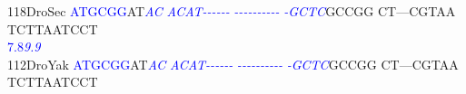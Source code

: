 \documentclass[11pt,twoside,reqno,a4paper]{article}
\begin{document}
{118\hspace*{1\charwidth}DroSec	\textcolor{Blue}{A}\textcolor{Blue}{T}\textcolor{Blue}{G}\textcolor{Blue}{C}\textcolor{Blue}{G}\textcolor{Blue}{G}AT\textit{\textcolor{Blue}{A}}\textit{\textcolor{Blue}{C}}	\textit{\textcolor{Blue}{A}}\textit{\textcolor{Blue}{C}}\textit{\textcolor{Blue}{A}}\textit{\textcolor{Blue}{T}}\textit{\textcolor{Blue}{-}}\textit{\textcolor{Blue}{-}}\textit{\textcolor{Blue}{-}}\textit{\textcolor{Blue}{-}}\textit{\textcolor{Blue}{-}}\textit{\textcolor{Blue}{-}}	\textit{\textcolor{Blue}{-}}\textit{\textcolor{Blue}{-}}\textit{\textcolor{Blue}{-}}\textit{\textcolor{Blue}{-}}\textit{\textcolor{Blue}{-}}\textit{\textcolor{Blue}{-}}\textit{\textcolor{Blue}{-}}\textit{\textcolor{Blue}{-}}\textit{\textcolor{Blue}{-}}\textit{\textcolor{Blue}{-}}	\textit{\textcolor{Blue}{-}}\textit{\textcolor{Blue}{G}}\textit{\textcolor{Blue}{C}}\textit{\textcolor{Blue}{T}}\textit{\textcolor{Blue}{C}}GCCGG	CT---CGTAA	TCTTAATCCT	\\
\hspace*{4\charwidth}\hspace*{7\charwidth}\hspace*{0\charwidth}\textcolor{Blue}{7.8}\hspace*{5\charwidth}\textit{\textcolor{Blue}{9.9}}\hspace*{1\charwidth}\hspace*{1\charwidth}\hspace*{1\charwidth}\hspace*{1\charwidth}\hspace*{1\charwidth}\hspace*{1\charwidth}\\
112\hspace*{1\charwidth}DroYak	\textcolor{Blue}{A}\textcolor{Blue}{T}\textcolor{Blue}{G}\textcolor{Blue}{C}\textcolor{Blue}{G}\textcolor{Blue}{G}AT\textit{\textcolor{Blue}{A}}\textit{\textcolor{Blue}{C}}	\textit{\textcolor{Blue}{A}}\textit{\textcolor{Blue}{C}}\textit{\textcolor{Blue}{A}}\textit{\textcolor{Blue}{T}}\textit{\textcolor{Blue}{-}}\textit{\textcolor{Blue}{-}}\textit{\textcolor{Blue}{-}}\textit{\textcolor{Blue}{-}}\textit{\textcolor{Blue}{-}}\textit{\textcolor{Blue}{-}}	\textit{\textcolor{Blue}{-}}\textit{\textcolor{Blue}{-}}\textit{\textcolor{Blue}{-}}\textit{\textcolor{Blue}{-}}\textit{\textcolor{Blue}{-}}\textit{\textcolor{Blue}{-}}\textit{\textcolor{Blue}{-}}\textit{\textcolor{Blue}{-}}\textit{\textcolor{Blue}{-}}\textit{\textcolor{Blue}{-}}	\textit{\textcolor{Blue}{-}}\textit{\textcolor{Blue}{G}}\textit{\textcolor{Blue}{C}}\textit{\textcolor{Blue}{T}}\textit{\textcolor{Blue}{C}}GCCGG	CT---CGTAA	TCTTAATCCT	\\
}
\end{document}
